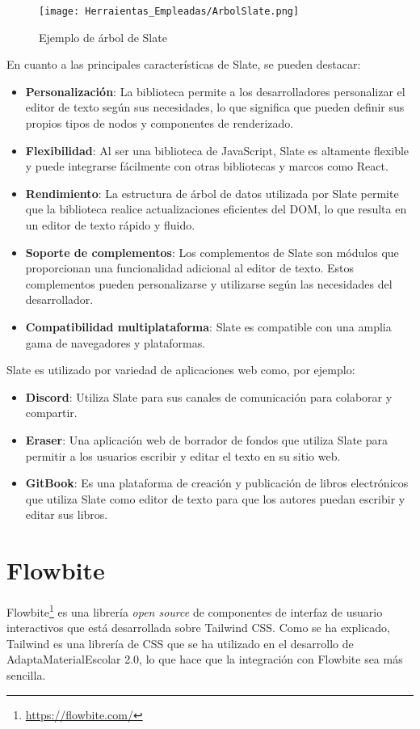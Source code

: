 \begin{figure}[ht!]
  \centering
  \texttt{[image: Herraientas\_Empleadas/ArbolSlate.png]}
  \caption{Ejemplo de árbol de Slate}
  \label{fig:arbolSlate}
\end{figure}

En cuanto a las principales características de Slate, se pueden destacar:

\begin{itemize}
  \item \textbf{Personalización}: La biblioteca permite a los desarrolladores personalizar el editor de texto según sus necesidades, lo que significa que pueden definir sus propios tipos de nodos y componentes de renderizado.
  \item \textbf{Flexibilidad}: Al ser una biblioteca de JavaScript, Slate es altamente flexible y puede integrarse fácilmente con otras bibliotecas y marcos como React.
  \item \textbf{Rendimiento}: La estructura de árbol de datos utilizada por Slate permite que la biblioteca realice actualizaciones eficientes del DOM, lo que resulta en un editor de texto rápido y fluido.
  \item \textbf{Soporte de complementos}: Los complementos de Slate son módulos que proporcionan una funcionalidad adicional al editor de texto. Estos complementos pueden personalizarse y utilizarse según las necesidades del desarrollador.
  \item \textbf{Compatibilidad multiplataforma}: Slate es compatible con una amplia gama de navegadores y plataformas.
\end{itemize}

Slate es utilizado por variedad de aplicaciones web como, por ejemplo:
\begin{itemize}
  \item \textbf{Discord}: Utiliza Slate para sus canales de comunicación para colaborar y compartir.
  \item \textbf{Eraser}: Una aplicación web de borrador de fondos que utiliza Slate para permitir a los usuarios escribir y editar el texto en su sitio web.
  \item \textbf{GitBook}: Es una plataforma de creación y publicación de libros electrónicos que utiliza Slate como editor de texto para que los autores puedan escribir y editar sus libros.
\end{itemize}

\section{Flowbite}\label{sec:Flowbite}
Flowbite\footnote{\url{https://flowbite.com/}} es una librería \textit{open source} de componentes de interfaz de usuario interactivos que está desarrollada sobre Tailwind CSS. Como se ha explicado, Tailwind es una librería de CSS que se ha utilizado en el desarrollo de AdaptaMaterialEscolar 2.0, lo que hace que la integración con Flowbite sea más sencilla.


